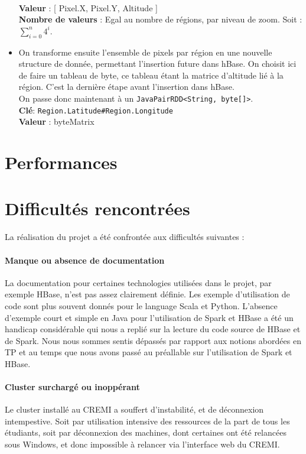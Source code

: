 \documentclass[a4paper]{article}
\begin{document}
\begin{itemize}
\\
\textbf{Valeur}  : [ {Pixel.X, Pixel.Y, Altitude} ]
\\
\textbf{Nombre de valeurs} : Egal au nombre de régions, par niveau de zoom. Soit : $\sum_{i=0}^{n} 4^{i}$.
\item On transforme ensuite l'ensemble de pixels par région en une nouvelle structure de donnée, permettant l'insertion future dans hBase. On choisit ici de faire un tableau de byte, ce tableau étant la matrice d'altitude lié à la région. C'est la dernière étape avant l'insertion dans hBase.
\\
On passe donc maintenant à un \texttt{JavaPairRDD<String, byte[]>}.
\\
\textbf{Clé}: \texttt{Region.Latitude\#Region.Longitude}
\\
\textbf{Valeur} : byteMatrix
\end{itemize}

\section{Performances}

\section{Difficultés rencontrées}

La réalisation du projet a été confrontée aux difficultés suivantes :

\paragraph{Manque ou absence de documentation} La documentation pour certaines technologies utilisées dans le projet, par exemple HBase, n'est pas assez clairement définie. Les exemple d'utilisation de code sont plus souvent donnés pour le language Scala et Python. L'absence d'exemple court et simple en Java pour l'utilisation de Spark et HBase a été un handicap considérable qui nous a replié sur la lecture du code source de HBase et de Spark. Nous nous sommes sentis dépassés par rapport aux notions abordées en TP et au temps que nous avons passé au préallable sur l'utilisation de Spark et HBase.

\paragraph{Cluster surchargé ou inoppérant} Le cluster installé au CREMI a souffert d'instabilité, et de déconnexion intempestive. Soit par utilisation intensive des ressources de la part de tous les étudiants, soit par déconnexion des machines, dont certaines ont été relancées sous Windows, et donc impossible à relancer via l'interface web du CREMI.
\end{document}
